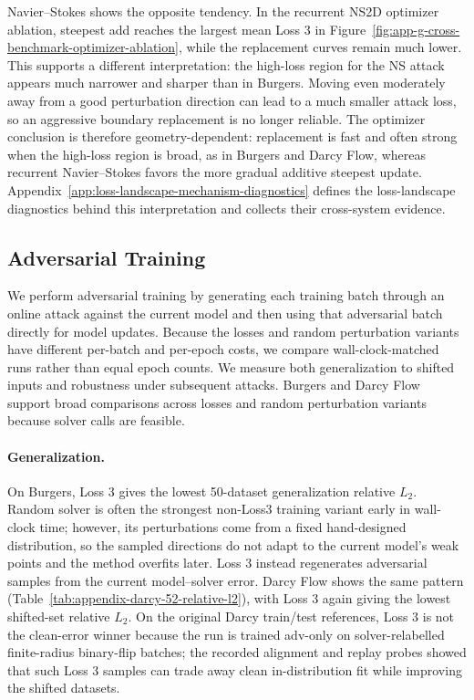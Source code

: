 \documentclass[letterpaper]{article} %
\newcommand{\figref}[1]{Figure~\ref{#1}}
\newcommand{\tabref}[1]{Table~\ref{#1}}
\newcommand{\appref}[1]{Appendix~\ref{#1}}
\begin{document}
Navier--Stokes shows the opposite tendency.  In the recurrent NS2D optimizer
ablation, steepest add reaches the largest mean Loss 3 in
\figref{fig:app-g-cross-benchmark-optimizer-ablation}, while the replacement
curves remain much lower.  This supports a different interpretation: the
high-loss region for the NS attack appears much narrower and sharper than in
Burgers.  Moving even moderately away from a good perturbation direction can
lead to a much smaller attack loss, so an aggressive boundary replacement is no
longer reliable.  The optimizer conclusion is therefore geometry-dependent:
replacement is fast and often strong when the high-loss region is broad, as in
Burgers and Darcy Flow, whereas recurrent Navier--Stokes favors the more gradual
additive steepest update.  \appref{app:loss-landscape-mechanism-diagnostics}
defines the loss-landscape diagnostics behind this interpretation and collects
their cross-system evidence.

\subsection{Adversarial Training}
\label{subsec:exp-adversarial-training}

We perform adversarial training by generating each training batch through an
online attack against the current model and then using that adversarial batch
directly for model updates. Because the losses and random perturbation variants
have different per-batch and per-epoch costs, we compare wall-clock-matched runs
rather than equal epoch counts. We measure both generalization to shifted inputs
and robustness under subsequent attacks. Burgers and Darcy Flow support broad
comparisons across losses and random perturbation variants because solver calls
are feasible.

\paragraph{Generalization.}
On Burgers, Loss 3 gives the lowest 50-dataset generalization relative \(L_2\).
Random solver is often the
strongest non-Loss3 training variant early in wall-clock time; however, its
perturbations come from a fixed hand-designed distribution, so the sampled
directions do not adapt to the current model's weak points and the method
overfits later. Loss 3 instead regenerates adversarial samples from the current
model--solver error. Darcy Flow shows the same pattern
(\tabref{tab:appendix-darcy-52-relative-l2}), with Loss 3 again giving
the lowest shifted-set relative \(L_2\). On the original Darcy train/test
references, Loss 3 is not the clean-error winner because the run is trained
adv-only on solver-relabelled finite-radius binary-flip batches; the recorded
alignment and replay probes showed that such Loss 3 samples can trade away
clean in-distribution fit while improving the shifted datasets.
\end{document}
